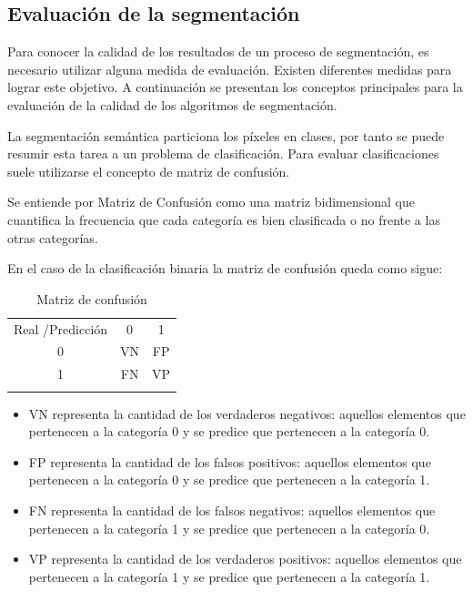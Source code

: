 \subsection{Evaluación de la segmentación}\label{sec:evalSeg}

Para conocer la calidad de los resultados de un proceso de segmentación, es necesario utilizar alguna medida de evaluación. Existen diferentes medidas para lograr este objetivo. A continuación se presentan los conceptos principales para la evaluación de la calidad de los algoritmos de segmentación.

La segmentación semántica particiona los píxeles en clases, por tanto se puede resumir esta tarea a un problema de clasificación. Para evaluar clasificaciones suele utilizarse el concepto de matriz de confusión.

\begin{definition}
	Se entiende por Matriz de Confusión como una matriz bidimensional que cuantifica la frecuencia que cada categoría es bien clasificada o no frente a las otras categorías.
\end{definition}

En el caso de la clasificación binaria la matriz de confusión queda como sigue:

\begin{table}[ht]
	\centering
	\begin{tabular}{|| c || c | c ||}
		\hhline{|=||=|=|}
		
		Real /Predicción & 0 & 1\\ \hhline{||=||=|=||}
		0 & VN & FP\\
		1 & FN & VP \\ \hhline{|=||=|=|}
	\end{tabular}
	\caption{Matriz de confusión}
	\label{tab:conf}
\end{table}

\begin{itemize}
	\item VN representa la cantidad  de los verdaderos negativos: aquellos elementos que pertenecen a la categoría 0 y se predice que pertenecen a la categoría 0.
	\item FP representa la cantidad  de  los falsos positivos: aquellos elementos que pertenecen a la categoría 0 y se predice que pertenecen a la categoría 1.
	\item FN representa la cantidad  de  los falsos negativos: aquellos elementos que pertenecen a la categoría 1 y se predice que pertenecen a la categoría 0.
	\item VP representa la cantidad  de  los verdaderos positivos: aquellos elementos que pertenecen a la categoría 1 y se predice que pertenecen a la categoría 1.
\end{itemize}

